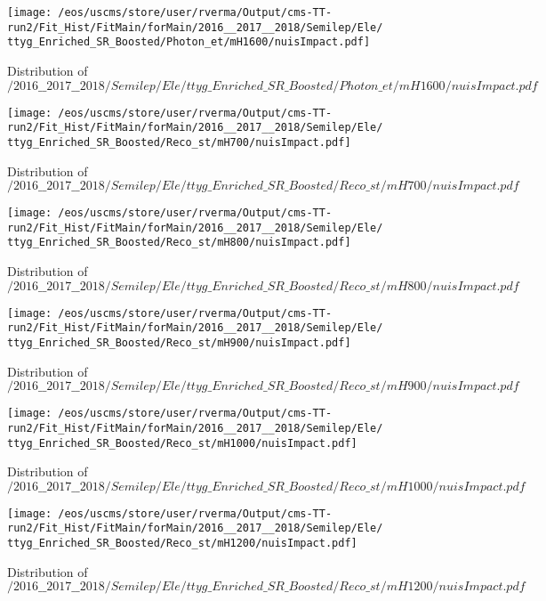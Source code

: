 \begin{figure}
\centering
\texttt{[image: /eos/uscms/store/user/rverma/Output/cms-TT-run2/Fit\_Hist/FitMain/forMain/2016\_\_2017\_\_2018/Semilep/Ele/ttyg\_Enriched\_SR\_Boosted/Photon\_et/mH1600/nuisImpact.pdf]}
\caption{Distribution of $/2016\_\_2017\_\_2018/Semilep/Ele/ttyg\_Enriched\_SR\_Boosted/Photon\_et/mH1600/nuisImpact.pdf$}
\end{figure}

\begin{figure}
\centering
\texttt{[image: /eos/uscms/store/user/rverma/Output/cms-TT-run2/Fit\_Hist/FitMain/forMain/2016\_\_2017\_\_2018/Semilep/Ele/ttyg\_Enriched\_SR\_Boosted/Reco\_st/mH700/nuisImpact.pdf]}
\caption{Distribution of $/2016\_\_2017\_\_2018/Semilep/Ele/ttyg\_Enriched\_SR\_Boosted/Reco\_st/mH700/nuisImpact.pdf$}
\end{figure}

\begin{figure}
\centering
\texttt{[image: /eos/uscms/store/user/rverma/Output/cms-TT-run2/Fit\_Hist/FitMain/forMain/2016\_\_2017\_\_2018/Semilep/Ele/ttyg\_Enriched\_SR\_Boosted/Reco\_st/mH800/nuisImpact.pdf]}
\caption{Distribution of $/2016\_\_2017\_\_2018/Semilep/Ele/ttyg\_Enriched\_SR\_Boosted/Reco\_st/mH800/nuisImpact.pdf$}
\end{figure}

\begin{figure}
\centering
\texttt{[image: /eos/uscms/store/user/rverma/Output/cms-TT-run2/Fit\_Hist/FitMain/forMain/2016\_\_2017\_\_2018/Semilep/Ele/ttyg\_Enriched\_SR\_Boosted/Reco\_st/mH900/nuisImpact.pdf]}
\caption{Distribution of $/2016\_\_2017\_\_2018/Semilep/Ele/ttyg\_Enriched\_SR\_Boosted/Reco\_st/mH900/nuisImpact.pdf$}
\end{figure}

\begin{figure}
\centering
\texttt{[image: /eos/uscms/store/user/rverma/Output/cms-TT-run2/Fit\_Hist/FitMain/forMain/2016\_\_2017\_\_2018/Semilep/Ele/ttyg\_Enriched\_SR\_Boosted/Reco\_st/mH1000/nuisImpact.pdf]}
\caption{Distribution of $/2016\_\_2017\_\_2018/Semilep/Ele/ttyg\_Enriched\_SR\_Boosted/Reco\_st/mH1000/nuisImpact.pdf$}
\end{figure}

\begin{figure}
\centering
\texttt{[image: /eos/uscms/store/user/rverma/Output/cms-TT-run2/Fit\_Hist/FitMain/forMain/2016\_\_2017\_\_2018/Semilep/Ele/ttyg\_Enriched\_SR\_Boosted/Reco\_st/mH1200/nuisImpact.pdf]}
\caption{Distribution of $/2016\_\_2017\_\_2018/Semilep/Ele/ttyg\_Enriched\_SR\_Boosted/Reco\_st/mH1200/nuisImpact.pdf$}
\end{figure}

